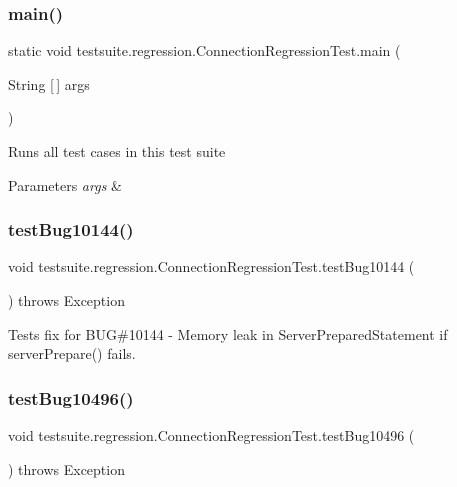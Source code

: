 \subsubsection{\texorpdfstring{main()}{main()}}
{\footnotesize\ttfamily static void testsuite.\+regression.\+Connection\+Regression\+Test.\+main (\begin{DoxyParamCaption}\item[{String \mbox{[}$\,$\mbox{]}}]{args }\end{DoxyParamCaption})\hspace{0.3cm}{\ttfamily [static]}}

Runs all test cases in this test suite


\begin{DoxyParams}{Parameters}
{\em args} & \\
\hline
\end{DoxyParams}
\mbox{\label{classtestsuite_1_1regression_1_1_connection_regression_test_aff36d0acf4519875786c945621230acb}} 
\subsubsection{\texorpdfstring{test\+Bug10144()}{testBug10144()}}
{\footnotesize\ttfamily void testsuite.\+regression.\+Connection\+Regression\+Test.\+test\+Bug10144 (\begin{DoxyParamCaption}{ }\end{DoxyParamCaption}) throws Exception}

Tests fix for B\+UG\#10144 -\/ Memory leak in Server\+Prepared\+Statement if server\+Prepare() fails. \mbox{\label{classtestsuite_1_1regression_1_1_connection_regression_test_a1a46119260190c85a4b8e8acbe3e9279}} 
\subsubsection{\texorpdfstring{test\+Bug10496()}{testBug10496()}}
{\footnotesize\ttfamily void testsuite.\+regression.\+Connection\+Regression\+Test.\+test\+Bug10496 (\begin{DoxyParamCaption}{ }\end{DoxyParamCaption}) throws Exception}

